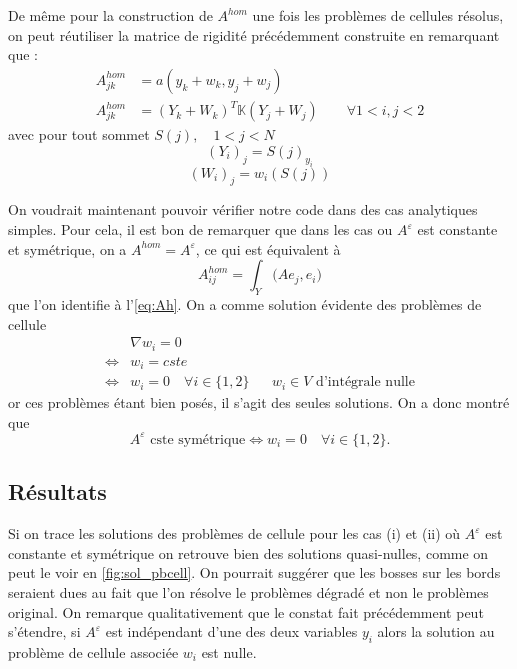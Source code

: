 \documentclass[11pt]{article}
\newcommand{\K}{\mathbb{K}}
\newcommand{\Ah}{A^{hom}}
\begin{document}
De même pour la construction de $\Ah$ une fois les problèmes de cellules résolus, on peut réutiliser la matrice de rigidité précédemment construite en remarquant que :
\begin{align*}
  \Ah_{jk} &= a(y_k+w_k, y_j+w_j) \\
  \Ah_{jk} &= (Y_k + W_k)^T \K (Y_j + W_j) \qquad \forall 1<i,j<2
\end{align*}
avec pour tout sommet $S(j), \quad 1<j<N $
\[
  (Y_i)_j = S(j)_{y_i} 
\]
\[
  (W_i)_j = w_i(S(j))
\]

On voudrait maintenant pouvoir vérifier notre code dans des cas analytiques simples. Pour cela, il est bon de remarquer que dans les cas ou $A^\varepsilon$ est
constante et symétrique, on a $\Ah=A^\varepsilon$, ce qui est équivalent à 
\[
  \Ah_{ij} = \int_Y \big(A e_j, e_i\big)
\]
que l'on identifie à l'\autoref{eq:Ah}. On a comme solution évidente des problèmes de cellule
\begin{align*}
  &\nabla w_i = 0 \\
  \iff &w_i = cste  \\
  \iff &w_i = 0 \quad \forall i \in \{1, 2\} && w_i \in V \text{ d'intégrale nulle}
\end{align*}
or ces problèmes étant bien posés, il s'agit des seules solutions. On a donc montré que
\[
  A^\varepsilon \text{ cste symétrique} \iff w_i = 0 \quad \forall i \in \{1, 2\}.
\]

\subsection{Résultats}

Si on trace les solutions des problèmes de cellule pour les cas (i) et (ii) où $A^\varepsilon$ est constante et symétrique on retrouve bien des solutions quasi-nulles, comme
on peut le voir en \autoref{fig:sol_pbcell}. On pourrait suggérer que les bosses sur les bords seraient dues au fait que l'on résolve le problèmes
dégradé et non le problèmes original. On remarque qualitativement que le constat fait précédemment peut s'étendre, si $A^\varepsilon$ est indépendant
d'une des deux variables $y_i$ alors la solution au problème de cellule associée $w_i$ est nulle.
\end{document}
